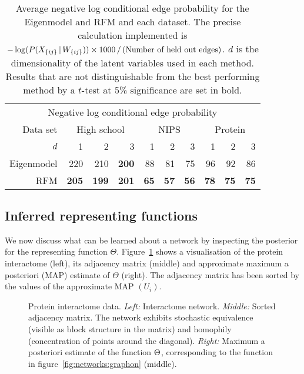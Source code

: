 \begin{table}
\begin{center}
  \begin{tabular}{r | r r r | r r r | r r r}
     \multicolumn{10}{c}{Negative log conditional edge probability} \\
     \addlinespace[2pt]
     Data set & \multicolumn{3}{c|}{High school} & \multicolumn{3}{c|}{NIPS} & \multicolumn{3}{c}{Protein} \\
    $d$ & 1 & 2 & 3 & 1 & 2 & 3 & 1 & 2 & 3 \\
    \midrule
    Eigenmodel & 220 & 210 & \textbf{200} & 88 & 81 & 75 & 96 & 92 & 86 \\
    RFM & \textbf{205} & \textbf{199} & \textbf{201} & \textbf{65} & \textbf{57} & \textbf{56} & \textbf{78} & \textbf{75} & \textbf{75}
  \end{tabular}
\end{center}
  \caption[Negative log conditional edge probabilities in link prediction experiment.]{Average negative log conditional edge probability for the Eigenmodel and RFM and each dataset.
  The precise calculation implemented is $-\log(P(X_{\lbrace ij \rbrace} \,|\, W_{\lbrace ij \rbrace})) \times 1000 \, / \,(\textrm{Number of held out edges})$.
  $d$ is the dimensionality of the latent variables used in each method. Results that are not distinguishable from the best performing method by a $t$-test at 5\% significance are set in bold.}
  \label{table:networks:probs}
\end{table}

\subsection{Inferred representing functions}

We now discuss what can be learned about a network by inspecting the posterior for the representing function $\Theta$.
Figure~\ref{fig:(R)GPLVM_Comparison} shows a visualisation of the protein interactome (left), its adjacency matrix (middle) and approximate maximum a posteriori (MAP) estimate of $\Theta$ (right).
The adjacency matrix has been sorted by the values of the approximate MAP $(U_i)$.

\begin{figure}[ht]
  \centering
  
  \vspace{-0.5cm}
  \caption[Unsorted and sorted protein interactome and visualisation of model fit.]{Protein interactome data. 
    \emph{Left:} Interactome network. 
    \emph{Middle:} Sorted adjacency matrix. The network exhibits stochastic equivalence 
    (visible as block structure in the matrix) and homophily (concentration of points around the diagonal). 
    \emph{Right:} Maximum a posteriori estimate of the function $\Theta$, corresponding to the function in figure~\ref{fig:networks:graphon} (middle).
  }
  \label{fig:(R)GPLVM_Comparison}
\end{figure}

